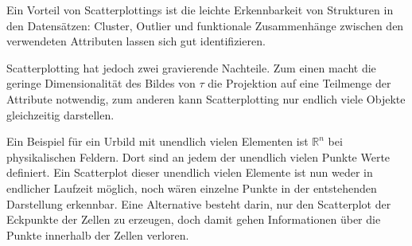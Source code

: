 \documentclass[a4paper,fontsize=12pt,toc=bib,halfparskip]{scrartcl}
\begin{document}
Ein Vorteil von Scatterplottings ist die leichte Erkennbarkeit von Strukturen in den Datens\"atzen: Cluster, Outlier und funktionale Zusammenh\"ange zwischen den verwendeten Attributen lassen sich gut identifizieren. 

Scatterplotting hat jedoch zwei gravierende Nachteile. Zum einen macht die geringe Dimensionalit\"at des Bildes von $\tau$ die Projektion auf eine Teilmenge der Attribute notwendig, zum anderen kann Scatterplotting nur endlich viele Objekte gleichzeitig darstellen. 

Ein Beispiel f\"ur ein Urbild mit unendlich vielen Elementen ist $\mathbb{R}^n$ bei physikalischen Feldern. Dort sind an jedem der unendlich vielen Punkte Werte definiert. Ein Scatterplot dieser unendlich vielen Elemente ist nun weder in endlicher Laufzeit m\"oglich, noch w\"aren einzelne Punkte in der entstehenden Darstellung erkennbar. Eine Alternative besteht darin, nur den Scatterplot der Eckpunkte der Zellen zu erzeugen, doch damit gehen Informationen \"uber die Punkte innerhalb der Zellen verloren.
\end{document}
